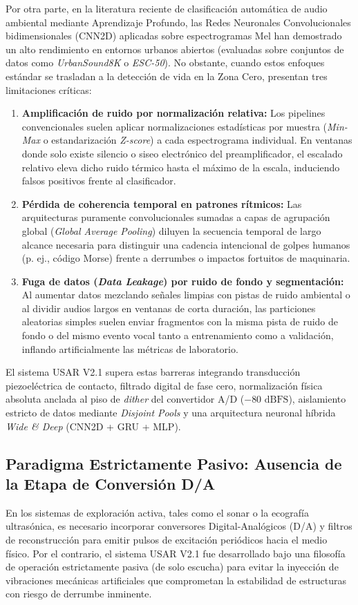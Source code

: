 \documentclass[11pt, a4paper]{article}
\begin{document}
Por otra parte, en la literatura reciente de clasificación automática de audio ambiental mediante Aprendizaje Profundo, las Redes Neuronales Convolucionales bidimensionales (CNN2D) aplicadas sobre espectrogramas Mel han demostrado un alto rendimiento en entornos urbanos abiertos (evaluadas sobre conjuntos de datos como \textit{UrbanSound8K} o \textit{ESC-50}). No obstante, cuando estos enfoques estándar se trasladan a la detección de vida en la Zona Cero, presentan tres limitaciones críticas:
\begin{enumerate}
    \item \textbf{Amplificación de ruido por normalización relativa:} Los pipelines convencionales suelen aplicar normalizaciones estadísticas por muestra (\textit{Min-Max} o estandarización \textit{Z-score}) a cada espectrograma individual. En ventanas donde solo existe silencio o siseo electrónico del preamplificador, el escalado relativo eleva dicho ruido térmico hasta el máximo de la escala, induciendo falsos positivos frente al clasificador.
    \item \textbf{Pérdida de coherencia temporal en patrones rítmicos:} Las arquitecturas puramente convolucionales sumadas a capas de agrupación global (\textit{Global Average Pooling}) diluyen la secuencia temporal de largo alcance necesaria para distinguir una cadencia intencional de golpes humanos (p. ej., código Morse) frente a derrumbes o impactos fortuitos de maquinaria.
    \item \textbf{Fuga de datos (\textit{Data Leakage}) por ruido de fondo y segmentación:} Al aumentar datos mezclando señales limpias con pistas de ruido ambiental o al dividir audios largos en ventanas de corta duración, las particiones aleatorias simples suelen enviar fragmentos con la misma pista de ruido de fondo o del mismo evento vocal tanto a entrenamiento como a validación, inflando artificialmente las métricas de laboratorio.
\end{enumerate}

El sistema USAR V2.1 supera estas barreras integrando transducción piezoeléctrica de contacto, filtrado digital de fase cero, normalización física absoluta anclada al piso de \textit{dither} del convertidor A/D ($-80\text{ dBFS}$), aislamiento estricto de datos mediante \textit{Disjoint Pools} y una arquitectura neuronal híbrida \textit{Wide \& Deep} (CNN2D + GRU + MLP).

\subsection{Paradigma Estrictamente Pasivo: Ausencia de la Etapa de Conversión D/A}
En los sistemas de exploración activa, tales como el sonar o la ecografía ultrasónica, es necesario incorporar conversores Digital-Analógicos (D/A) y filtros de reconstrucción para emitir pulsos de excitación periódicos hacia el medio físico. Por el contrario, el sistema USAR V2.1 fue desarrollado bajo una filosofía de operación estrictamente pasiva (de solo escucha) para evitar la inyección de vibraciones mecánicas artificiales que comprometan la estabilidad de estructuras con riesgo de derrumbe inminente.
\end{document}
